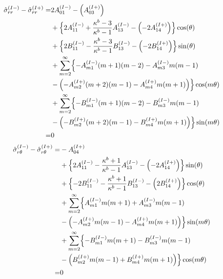 \begin{align}
	\hat{\sigma}_{rr}^{(I-)}-\hat{\sigma}_{rr}^{(I+)} =
	&2A_{01}^{(I-)}-\Bigl(A_{03}^{(I+)}\Bigr)
	\nonumber
	\\
	&+\Bigl\{2A_{11}^{(I-)}+\frac{\kappa^{b}-3}{\kappa^{b}-1}A_{13}^{(I-)}
	-\Bigl(-2A_{14}^{(I+)}\Bigr)\Bigr\}\cos(\theta)
	\nonumber
	\\
	&+\Bigl\{2B_{11}^{(I-)}
	-\frac{\kappa^{b}-3}{\kappa^{b}-1}B_{13}^{(I-)}
	-\Bigl(-2B_{14}^{(I+)}\Bigr)\Bigr\}\sin(\theta)
	\nonumber
	\\
	&+\sum_{m=2}^{\infty}\Bigl\{
	-A_{m1}^{(I-)}(m+1)(m-2)-A_{m3}^{(I-)}m(m-1)
	\nonumber
	\\
	&-\Bigl(-A_{m2}^{(I+)}(m+2)(m-1)-A_{m4}^{(I+)}m(m+1)\Bigr)
	\Bigr\}\cos(m\theta)
	\nonumber
	\\
	&+\sum_{m=2}^{\infty}\Bigl\{
	-B_{m1}^{(I-)}(m+1)(m-2)-B_{m3}^{(I-)}m(m-1)
	\nonumber
	\\
	&-\Bigl(-B_{m2}^{(I+)}(m+2)(m-1)-B_{m4}^{(I+)}m(m+1)\Bigr)
	\Bigr\}\sin(m\theta)
	\nonumber
	\\
	=&0
	\label{eq:SigmaRReq}
\end{align}
\begin{align}
	\hat{\sigma}_{r\theta}^{(I-)}-\hat{\sigma}_{r\theta}^{(I+)} =
	&-A_{04}^{(I+)}
	\nonumber
	\\
	&+\Bigl\{2A_{11}^{(I-)}-\frac{\kappa^{b}+1}{\kappa^{b}-1}A_{13}^{(I-)}
	-\Bigl(-2A_{14}^{(I+)}\Bigr)\Bigr\}\sin(\theta)
	\nonumber
	\\
	&+\Bigl\{-2B_{11}^{(I-)}-\frac{\kappa^{b}+1}{\kappa^{b}-1}B_{13}^{(I-)}
	-\Bigl(2B_{14}^{(I+)}\Bigr)\Bigr\}\cos(\theta)
	\nonumber
	\\
	&+\sum_{m=2}^{\infty}\Bigl\{
 	A_{m1}^{(I-)}m(m+1)+A_{m3}^{(I-)}m(m-1)
	\nonumber
	\\
	&-\Bigl(-A_{m2}^{(I+)}m(m-1)-A_{m4}^{(I+)}m(m+1)\Bigr)
	\Bigr\}\sin(m\theta)
	\nonumber
	\\
	&+\sum_{m=2}^{\infty}\Bigl\{
	-B_{m1}^{(I-)}m(m+1)-B_{m3}^{(I-)}m(m-1)
	\nonumber
	\\
	&-\Bigl(B_{m2}^{(I+)}m(m-1)+B_{m4}^{(I+)}m(m+1)\Bigr)
	\Bigr\}\cos(m\theta)
	\nonumber
	\\
	=&0
	\label{eq:SigmaRTh1eq}
\end{align}

\newpage